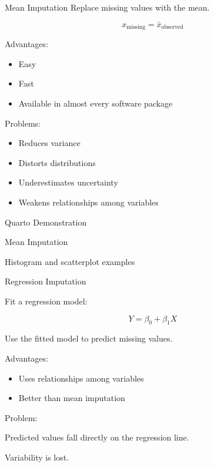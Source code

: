 \documentclass{beamer}
\begin{document}
\begin{frame}{Mean Imputation}
Replace missing values with the mean.

\[
x_{\text{missing}} = \bar{x}_{\text{observed}}
\]

\vspace{0.3cm}

Advantages:
\begin{itemize}
\item Easy
\item Fast
\item Available in almost every software package
\end{itemize}

\vspace{0.3cm}

Problems:
\begin{itemize}
\item Reduces variance
\item Distorts distributions
\item Underestimates uncertainty
\item Weakens relationships among variables
\end{itemize}
\end{frame}

\begin{frame}[plain]
\centering
\vfill
{\Huge Quarto Demonstration}

\vspace{0.5cm}

{\Large Mean Imputation}

\vspace{0.5cm}

Histogram and scatterplot examples

\vfill
\end{frame}

\begin{frame}{Regression Imputation}

Fit a regression model:

\[
Y = \beta_0 + \beta_1 X
\]

Use the fitted model to predict missing values.

\vspace{0.3cm}

Advantages:

\begin{itemize}
\item Uses relationships among variables
\item Better than mean imputation
\end{itemize}

\vspace{0.3cm}

Problem:

Predicted values fall directly on the regression line.

Variability is lost.
\end{frame}
\end{document}
